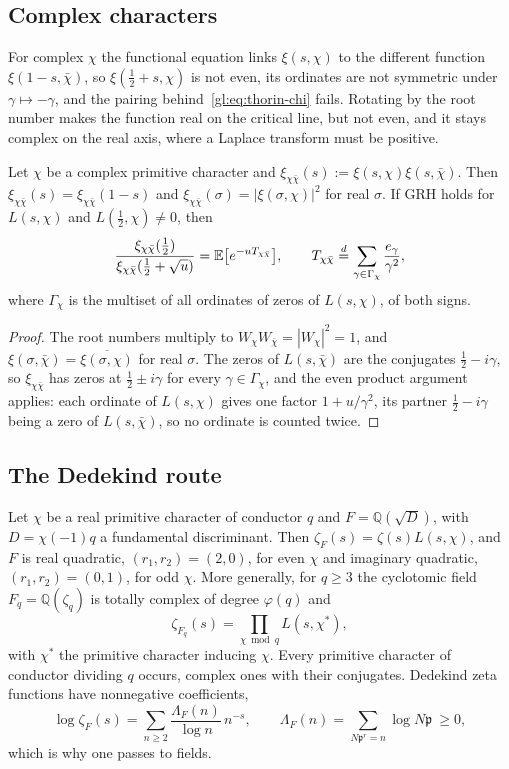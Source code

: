 \subsection{Complex characters}

For complex $\chi$ the functional equation links $\xi(s,\chi)$ to the different function $\xi(1-s,\bar\chi)$, so $\xi(\tfrac12+s,\chi)$ is not even, its ordinates are not symmetric under $\gamma\mapsto-\gamma$, and the pairing behind~\eqref{gl:eq:thorin-chi} fails. Rotating by the root number makes the function real on the critical line, but not even, and it stays complex on the real axis, where a Laplace transform must be positive.

\begin{proposition}\label{gl:prop:Lcomplex}
Let $\chi$ be a complex primitive character and $\xi_{\chi\bar\chi}(s) := \xi(s,\chi)\xi(s,\bar\chi)$. Then $\xi_{\chi\bar\chi}(s)=\xi_{\chi\bar\chi}(1-s)$ and $\xi_{\chi\bar\chi}(\sigma)=|\xi(\sigma,\chi)|^2$ for real $\sigma$. If GRH holds for $L(s,\chi)$ and $L(\tfrac12,\chi)\neq0$, then
\[
\frac{\xi_{\chi\bar\chi}(\tfrac12)}{\xi_{\chi\bar\chi}(\tfrac12+\sqrt u)} = \mathbb{E}\big[e^{-uT_{\chi\bar\chi}}\big],\qquad T_{\chi\bar\chi}\stackrel{d}{=}\sum_{\gamma\in\Gamma_\chi}\frac{e_\gamma}{\gamma^2},
\]
where $\Gamma_\chi$ is the multiset of all ordinates of zeros of $L(s,\chi)$, of both signs.
\end{proposition}

\begin{proof}
The root numbers multiply to $W_\chi W_{\bar\chi}=|W_\chi|^2=1$, and $\xi(\sigma,\bar\chi)=\overline{\xi(\sigma,\chi)}$ for real $\sigma$. The zeros of $L(s,\bar\chi)$ are the conjugates $\tfrac12-i\gamma$, so $\xi_{\chi\bar\chi}$ has zeros at $\tfrac12\pm i\gamma$ for every $\gamma\in\Gamma_\chi$, and the even product argument applies: each ordinate of $L(s,\chi)$ gives one factor $1+u/\gamma^2$, its partner $\tfrac12-i\gamma$ being a zero of $L(s,\bar\chi)$, so no ordinate is counted twice.
\end{proof}

\subsection{The Dedekind route}

Let $\chi$ be a real primitive character of conductor $q$ and $F=\mathbb Q(\sqrt D)$, with $D=\chi(-1)q$ a fundamental discriminant. Then $\zeta_F(s)=\zeta(s)L(s,\chi)$, and $F$ is real quadratic, $(r_1,r_2)=(2,0)$, for even $\chi$ and imaginary quadratic, $(r_1,r_2)=(0,1)$, for odd $\chi$. More generally, for $q\ge3$ the cyclotomic field $F_q=\mathbb Q(\zeta_q)$ is totally complex of degree $\varphi(q)$ and
\begin{equation}\label{gl:eq:cyclotomic}
\zeta_{F_q}(s)=\prod_{\chi\bmod q}L(s,\chi^*),
\end{equation}
with $\chi^*$ the primitive character inducing $\chi$. Every primitive character of conductor dividing $q$ occurs, complex ones with their conjugates. Dedekind zeta functions have nonnegative coefficients,
\[
\log\zeta_F(s)=\sum_{n\ge2}\frac{\Lambda_F(n)}{\log n}\,n^{-s},\qquad \Lambda_F(n)=\sum_{N\mathfrak p^r=n}\log N\mathfrak p\ \ge0,
\]
which is why one passes to fields.

